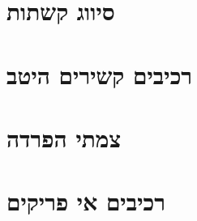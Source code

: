 \documentclass[]{article}
\def\insert#1{}
\begin{document}
\section*{סיווג קשתות}
\insert{edges}

\section*{רכיבים קשירים היטב}
\insert{scc}

\section*{צמתי הפרדה}
\insert{cut-vertex}

\section*{רכיבים אי פריקים}
\insert{block}
\end{document}

